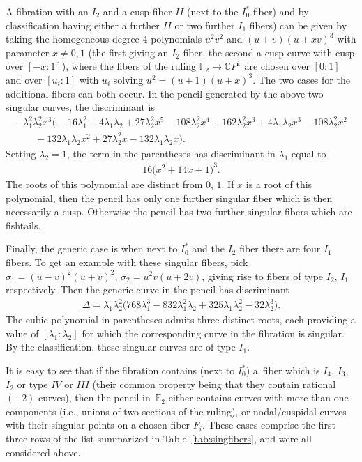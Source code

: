 \documentclass[10pt,a4paper]{amsart}
\newcommand{\CP}[1]{\mathbb{C}P^{#1}} %
\numberwithin{equation}{section}
\begin{document}
\begin{Example}A fibration with an $I_2$ and a cusp fiber $II$ (next to the $I_0^*$
fiber) and by classification having either a further $II$ or two
further $I_1$ fibers) can be given by taking the homogeneous degree-4
polynomials $u^2v^2$ and $(u+v)(u+xv)^3$ with parameter $x\neq 0, 1$
(the first giving an $I_2$ fiber, the second a cusp curve with cusp
over $[-x:1]$), where the fibers of the ruling ${\mathbb {F}}_2\to
\CP{1}$ are chosen over $[0:1]$ and over $[u_i:1]$ with $u_i$ solving
$u^2=(u+1)(u+x)^3$. The two cases for the additional fibers can both
occur. In the pencil generated by the above two singular curves, the
discriminant is
\begin{gather*}
-\lambda _1^2 \lambda _2^2 x^3 \big({-}16 \lambda _1^2+4 \lambda _1 \lambda _2+ 27 \lambda _2^2 x^5-108 \lambda _2^2 x^4+162
 \lambda _2^2 x^3+4 \lambda _1 \lambda _2 x^3-108 \lambda _2^2 x^2 \\
\qquad{} -132 \lambda _1 \lambda _2 x^2+27 \lambda _2^2 x-132 \lambda _1 \lambda _2 x\big).
\end{gather*}
Setting $\lambda _2=1$, the term in the parentheses has discriminant
in $\lambda_1$ equal to
\begin{gather*}
	16 \big(x^2+14 x+1\big)^3.
\end{gather*}
The roots of this polynomial are distinct from $0$, $1$. If $x$ is a
root of this polynomial, then the pencil has only one further singular
fiber which is then necessarily a cusp. Otherwise the pencil has two
further singular fibers which are fishtails.

Finally, the generic case is when next to $I_0^*$ and the $I_2$ fiber
there are four $I_1$ fibers. To get an example with these singular
fibers, pick $\sigma_1 = (u-v)^2 (u+v)^2$, $\sigma_2 = u^2 v (u+2v)$,
giving rise to fibers of type $I_2$, $I_1$ respectively. Then the
generic curve in the pencil has discriminant
\begin{gather*}
 \Delta = \lambda_1 \lambda_2^2 \big(768 \lambda_1^3 - 832 \lambda_1^2 \lambda_2 + 325 \lambda_1 \lambda_2^2 -32 \lambda_2^3\big).
\end{gather*}
The cubic polynomial in parentheses admits three distinct roots, each providing a value of $[\lambda_1 : \lambda_2]$
for which the corresponding curve in the fibration is singular. By the classification, these singular curves are of type $I_1$.
\end{Example}

It is easy to see that if the fibration contains (next to $I_0^*$) a~fiber which is $I_4$, $I_3$, $I_2$ or type $IV$ or $III$ (their common property
being that they contain rational $(-2)$-curves), then the pencil in~${\mathbb {F}}_2$
either contains curves with more than one components (i.e., unions
of two sections of the ruling), or nodal/cuspidal curves with their
singular points on a chosen fiber $F_i$. These cases comprise the first three rows
of the list summarized in Table~\ref{tab:singfibers}, and were all considered above.
\end{document}
